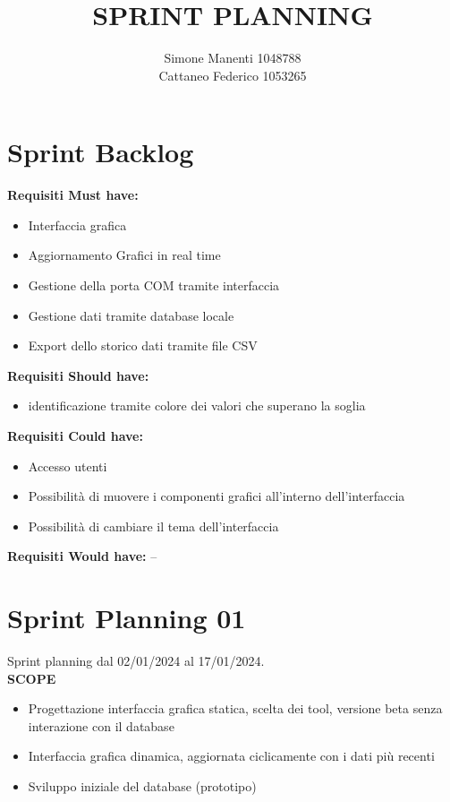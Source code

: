 \documentclass{report}
\title{SPRINT PLANNING}
\author{Simone Manenti 1048788 \\ Cattaneo Federico 1053265}
\begin{document}
\maketitle
\chapter{Sprint Backlog}
\textbf{Requisiti Must have:}
\begin{itemize}
\item Interfaccia grafica
\item Aggiornamento Grafici in real time
\item Gestione della porta COM tramite interfaccia
\item Gestione dati tramite database locale
\item Export dello storico dati tramite file CSV
\end{itemize}

\textbf{Requisiti Should have:}
\begin{itemize}
\item identificazione tramite colore dei valori che superano la soglia
\end{itemize}

\textbf{Requisiti Could have:}
\begin{itemize}
\item Accesso utenti
\item Possibilità di muovere i componenti grafici all'interno dell'interfaccia
\item Possibilità di cambiare il tema dell'interfaccia
\end{itemize}

\textbf{Requisiti Would have:}
--

\chapter{Sprint Planning 01}
Sprint planning dal 02/01/2024 al 17/01/2024.\\

\textbf{SCOPE}
\begin{itemize}
\item Progettazione interfaccia grafica statica, scelta dei tool, versione beta senza interazione con il database
\item Interfaccia grafica dinamica, aggiornata ciclicamente con i dati più recenti
\item Sviluppo iniziale del database (prototipo)
\end{itemize}
\end{document}
